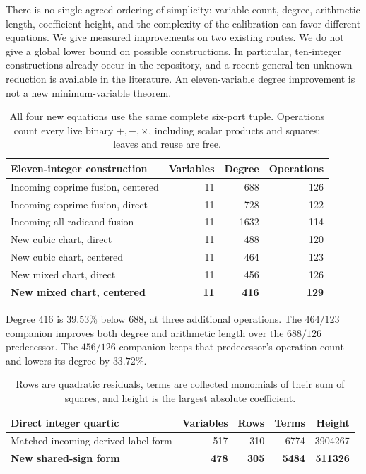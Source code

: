 \documentclass[11pt]{article}
\theoremstyle{definition}
\theoremstyle{remark}
\begin{document}
There is no single agreed ordering of simplicity: variable count,
degree, arithmetic length, coefficient height, and the complexity of
the calibration can favor different equations. We give measured
improvements on two existing routes. We do not give a global lower
bound on possible constructions. In particular, ten-integer
constructions already occur in the repository, and a recent general
ten-unknown reduction is available in the literature\cite{sun2026}.
An eleven-variable degree improvement is not a new minimum-variable
theorem.

\begin{table}[ht]
\centering
\begin{tabular}{lrrr}
\toprule
Eleven-integer construction & Variables & Degree & Operations\\
\midrule
Incoming coprime fusion, centered & 11 & 688 & 126\\
Incoming coprime fusion, direct & 11 & 728 & 122\\
Incoming all-radicand fusion & 11 & 1632 & 114\\
New cubic chart, direct & 11 & 488 & 120\\
New cubic chart, centered & 11 & 464 & 123\\
New mixed chart, direct & 11 & 456 & 126\\
\textbf{New mixed chart, centered} & \textbf{11} & \textbf{416} & \textbf{129}\\
\bottomrule
\end{tabular}
\caption{All four new equations use the same complete six-port tuple.
Operations count every live binary $+,-,\times$, including scalar
products and squares; leaves and reuse are free.}
\label{tab:norm}
\end{table}

Degree $416$ is $39.53\%$ below $688$, at three additional operations.
The $464/123$ companion improves both degree and arithmetic length over
the $688/126$ predecessor. The $456/126$ companion keeps that predecessor's
operation count and lowers its degree by $33.72\%$.

\begin{table}[ht]
\centering
\begin{tabular}{lrrrr}
\toprule
Direct integer quartic & Variables & Rows & Terms & Height\\
\midrule
Matched incoming derived-label form & 517 & 310 & 6774 & 3904267\\
\textbf{New shared-sign form} & \textbf{478} & \textbf{305} & \textbf{5484} & \textbf{511326}\\
\bottomrule
\end{tabular}
\caption{Rows are quadratic residuals, terms are collected monomials
of their sum of squares, and height is the largest absolute coefficient.}
\label{tab:quartic}
\end{table}
\end{document}
